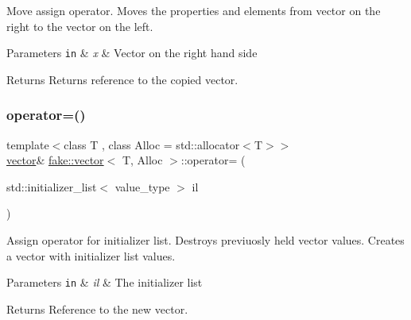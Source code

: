Move assign operator. Moves the properties and elements from vector on the right to the vector on the left. 


\begin{DoxyParams}[1]{Parameters}
\mbox{\tt in}  & {\em x} & Vector on the right hand side\\
\hline
\end{DoxyParams}
\begin{DoxyReturn}{Returns}
Returns reference to the copied vector. 
\end{DoxyReturn}
\mbox{\label{classfake_1_1vector_a7c88fffd66b9f4b518098681050904b6}} 
\subsubsection{\texorpdfstring{operator=()}{operator=()}\hspace{0.1cm}{\footnotesize\ttfamily [3/3]}}
{\footnotesize\ttfamily template$<$class T , class Alloc  = std\+::allocator$<$\+T$>$$>$ \\
\mbox{\hyperlink{classfake_1_1vector}{vector}}\& \mbox{\hyperlink{classfake_1_1vector}{fake\+::vector}}$<$ T, Alloc $>$\+::operator= (\begin{DoxyParamCaption}\item[{std\+::initializer\+\_\+list$<$ value\+\_\+type $>$}]{il }\end{DoxyParamCaption})\hspace{0.3cm}{\ttfamily [inline]}}



Assign operator for initializer list. Destroys previuosly held vector values. Creates a vector with initializer list values. 


\begin{DoxyParams}[1]{Parameters}
\mbox{\tt in}  & {\em il} & The initializer list\\
\hline
\end{DoxyParams}
\begin{DoxyReturn}{Returns}
Reference to the new vector. 
\end{DoxyReturn}
\mbox{\label{classfake_1_1vector_aec71da0fa184c234784f6895d8945d03}} 
